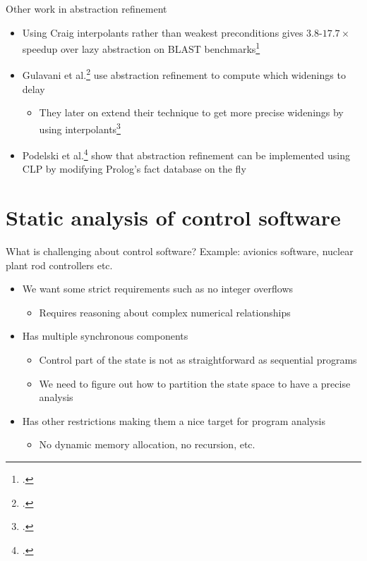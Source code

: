 \documentclass[aspectratio=169]{beamer}
\begin{document}
\begin{frame}{Other work in abstraction refinement}
  \begin{itemize}[<+->]
  \item Using Craig interpolants rather than weakest preconditions gives $3.8$-$17.7\times$ speedup over lazy abstraction on BLAST benchmarks\footcite{mcmillan2006lazy}
  \item Gulavani et al.\footcite{gulavani2006counterexample} use abstraction refinement to compute which widenings to delay
    \begin{itemize}
    \item They later on extend their technique to get more precise widenings by using interpolants\footcite{gulavani2008automatically}
    \end{itemize}
    \item Podelski et al.\footcite{podelski2007armc} show that abstraction refinement can be implemented using CLP by modifying Prolog's fact database on the fly
  \end{itemize}
\end{frame}

\section{Static analysis of control software}
\begin{frame}{What is challenging about control software?}
  Example: avionics software, nuclear plant rod controllers etc.

  \begin{itemize}[<+->]
  \item We want some strict requirements such as no integer overflows
    \begin{itemize}
    \item Requires reasoning about complex numerical relationships
    \end{itemize}
  \item Has multiple synchronous components
    \begin{itemize}
    \item Control part of the state is not as straightforward as sequential programs
    \item We need to figure out how to partition the state space to have a precise analysis
    \end{itemize}
  \item Has other restrictions making them a nice target for program analysis
    \begin{itemize}
    \item No dynamic memory allocation, no recursion, etc.
    \end{itemize}
  \end{itemize}

\end{frame}
\end{document}
